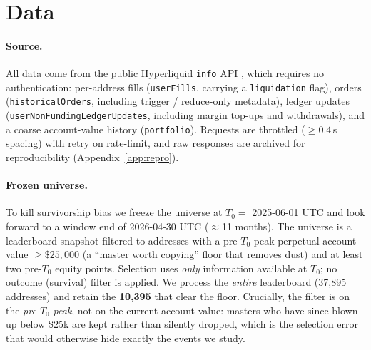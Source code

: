 \documentclass[11pt,a4paper]{article}
\newcommand{\Tnull}{T_{0}}
\begin{document}
\section{Data}
\label{sec:data}

\paragraph{Source.}
All data come from the public Hyperliquid \texttt{info} API
\citep{hyperliquid2024docs}, which requires no authentication: per-address fills
(\texttt{userFills}, carrying a \texttt{liquidation} flag), orders
(\texttt{historicalOrders}, including trigger / reduce-only metadata), ledger
updates (\texttt{userNonFundingLedgerUpdates}, including margin top-ups and
withdrawals), and a coarse account-value history (\texttt{portfolio}). Requests are
throttled ($\geq 0.4$\,s spacing) with retry on rate-limit, and raw responses are
archived for reproducibility (Appendix~\ref{app:repro}).

\paragraph{Frozen universe.}
To kill survivorship bias we freeze the universe at $\Tnull = $ 2025-06-01 UTC and
look forward to a window end of 2026-04-30 UTC ($\approx$11 months). The universe
is a leaderboard snapshot filtered to addresses with a pre-$\Tnull$ peak perpetual
account value $\geq \$25{,}000$ (a ``master worth copying'' floor that removes
dust) and at least two pre-$\Tnull$ equity points. Selection uses \emph{only}
information available at $\Tnull$; no outcome (survival) filter is applied. We
process the \emph{entire} leaderboard (37{,}895 addresses) and retain the
\textbf{10{,}395} that clear the floor. Crucially, the filter is on the
\emph{pre-}$\Tnull$ \emph{peak}, not on the current account value: masters who have
since blown up below \$25k are kept rather than silently dropped, which is the
selection error that would otherwise hide exactly the events we study.
\end{document}
